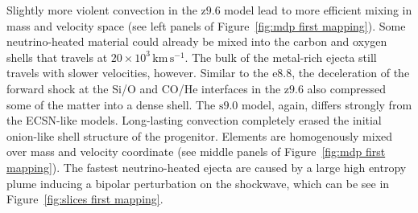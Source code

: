 \documentclass[fleqn,usenatbib]{mnras}
\newcommand{\kms}{\ensuremath{\mathrm{km\, s^{-1}}}}
\newcommand{\onemg}{\ensuremath{\mathrm{e8.8}}\xspace}
\newcommand{\snine}{\ensuremath{\mathrm{s9.0}}\xspace}
\newcommand{\znine}{\ensuremath{\mathrm{z9.6}}\xspace}
\begin{document}
Slightly more violent convection in the \znine model lead to more efficient mixing in mass and velocity space (see left panels of Figure~\ref{fig:mdp first mapping}). Some neutrino-heated material could already be mixed into the carbon and oxygen shells that travels at $20\times 10^3\,\kms$. The bulk of the metal-rich ejecta still travels with slower velocities, however. 
Similar to the \onemg, the deceleration of the forward shock at the Si/O and CO/He interfaces in the \znine also compressed some of the matter into a dense shell. 
The \snine model, again, differs strongly from the ECSN-like models. 
Long-lasting convection completely erased the initial onion-like shell structure of the progenitor. Elements are homogenously mixed over mass and velocity coordinate (see middle panels of Figure~\ref{fig:mdp first mapping}).
The fastest neutrino-heated ejecta are caused by a large high entropy plume inducing a bipolar perturbation on the shockwave, which can be see in Figure~\ref{fig:slices first mapping}.
\end{document}
